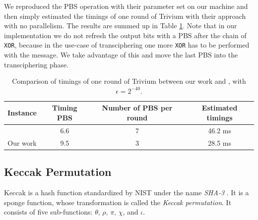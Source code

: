 We reproduced the \gls{PBS} operation with their parameter set on our machine and then simply estimated the timings of one round of Trivium with their approach with no parallelism. The results are summed up in Table \ref{tab:perfs_trivium}. Note that in our implementation we do not refresh the output bits with a \gls{PBS} after the chain of \texttt{XOR}, because in the use-case of transciphering one more \texttt{XOR} has to be performed with the message. We take advantage of this and move the last \gls{PBS} into the transciphering phase.

\begin{table}[htbp]
\centering
\caption{Comparison of timings of one round of Trivium between our work and \cite{DBLP:conf/wahc/BalenboisOS23}, with $\epsilon=2^{-40}$.}
\label{tab:perfs_trivium}
\begin{tabular}{|c|c|c|c|}
\hline
Instance & Timing \gls{PBS} & Number of \gls{PBS} per round & Estimated timings \\
\hline
\cite{DBLP:conf/wahc/BalenboisOS23} & 6.6 & 7 & 46.2 ms \\
\hline
Our work & 9.5 & 3 & 28.5 ms \\
\hline
\end{tabular}
\end{table}

\subsection{Keccak Permutation}
\label{sec:keccak}

Keccak is a hash function standardized by NIST under the name \emph{SHA-3} \cite{sha-3}. It is a sponge function, whose transformation is called the \emph{Keccak permutation}. It consists of five sub-functions: $\theta$, $\rho$, $\pi$, $\chi$, and $\iota$.


